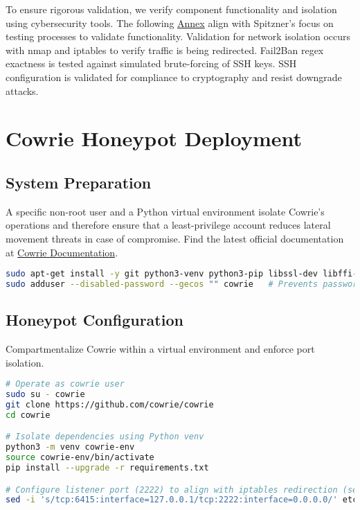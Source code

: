 \documentclass{cls/ULBreport}
\begin{document}
        To ensure rigorous validation, we verify component functionality and isolation using cybersecurity tools. The following \hyperref[annexes:network]{Annex} align with Spitzner's focus on testing processes to validate functionality. Validation for network isolation occurs with nmap and iptables to verify traffic is being redirected. Fail2Ban regex exactness is tested against simulated brute-forcing of SSH keys. SSH configuration is validated for compliance to cryptography and resist downgrade attacks.
        


    \section{Cowrie Honeypot Deployment}
\label{sec:cowrie}
    \subsection{System Preparation}
    A specific non-root user and a Python virtual environment isolate Cowrie's operations and therefore ensure that a least-privilege account reduces lateral movement threats in case of compromise. Find the latest official documentation at \href{https://docs.cowrie.org/en/latest/INSTALL.html}{Cowrie Documentation}.
    \begin{lstlisting}[language=bash,caption={Cowrie User Creation}]
sudo apt-get install -y git python3-venv python3-pip libssl-dev libffi-dev build-essential libpython3-dev authbind # Binds privileged ports without root
sudo adduser --disabled-password --gecos "" cowrie   # Prevents password-based connections 
    \end{lstlisting}

    \subsection{Honeypot Configuration}
    Compartmentalize Cowrie within a virtual environment and enforce port isolation.
    \begin{lstlisting}[language=bash,caption={Cowrie Honeypot Setup}]
# Operate as cowrie user
sudo su - cowrie  
git clone https://github.com/cowrie/cowrie  
cd cowrie  

# Isolate dependencies using Python venv
python3 -m venv cowrie-env  
source cowrie-env/bin/activate  
pip install --upgrade -r requirements.txt  

# Configure listener port (2222) to align with iptables redirection (section 2.3)
sed -i 's/tcp:6415:interface=127.0.0.1/tcp:2222:interface=0.0.0.0/' etc/cowrie.cfg  
    \end{lstlisting}
\end{document}
